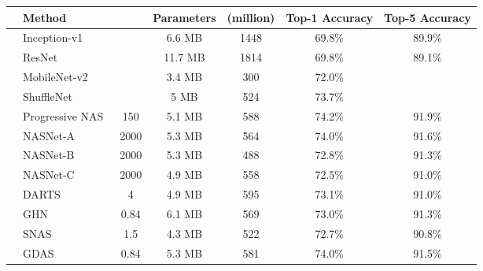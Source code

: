\documentclass[10pt,twocolumn,letterpaper]{article}
\begin{document}
\begin{table*}[t!]
\centering
\setlength{\tabcolsep}{5pt}
\begin{tabular}{| c | l | c | c | c | c | c |} \hline
 &   Method  &           & Parameters &  (million) & Top-1 Accuracy & Top-5 Accuracy \\ \hline
{}
 & Inception-v1~\cite{szegedy2015going}             &   &  6.6 MB  &      1448     &    69.8\%      & 89.9\%         \\
 & ResNet~\cite{he2016deep}                         &   &  11.7 MB &      1814     &    69.8\%      & 89.1\%         \\
 & MobileNet-v2~\cite{sandler2018mobilenetv2}       &   &  3.4 MB  &      300      &    72.0\%      &  \\
 &  ShuffleNet~\cite{Zhang_2018_CVPR}               &   &  5 MB &      524      &    73.7\%      &  \\ \hline\hline
{}
 & Progressive NAS~\cite{Liu_2018_ECCV}             & 150  & 5.1 MB   &    588        &    74.2\%      & 91.9\%         \\
 & NASNet-A~\cite{Zoph_2018_CVPR}                   & 2000 & 5.3 MB   &    564        &    74.0\%      & 91.6\%         \\
 & NASNet-B~\cite{Zoph_2018_CVPR}                   & 2000 & 5.3 MB   &    488        &    72.8\%      & 91.3\%         \\
 & NASNet-C~\cite{Zoph_2018_CVPR}                   & 2000 & 4.9 MB   &    558        &    72.5\%      & 91.0\%         \\
\hline\hline
{}
 & DARTS~\cite{liu2019darts}                        & 4    & 4.9 MB   &    595        &    73.1\%      & 91.0\%  \\
 & GHN~\cite{zhang2019graph}                        & 0.84 & 6.1 MB   &    569        &    73.0\%      & 91.3\%  \\
 & SNAS~\cite{xie2019snas}                          & 1.5  & 4.3 MB   &    522        &    72.7\%      & 90.8\%  \\
 & GDAS~\cite{dong2019search}                       & 0.84 & 5.3 MB   &    581        &    74.0\%      & 91.5\%  \\ 

\end{tabular}
\end{table*}
\end{document}
